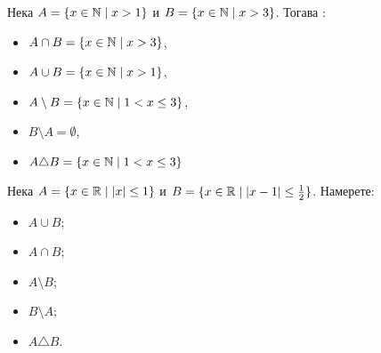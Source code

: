 \begin{example}
  Нека $A = \{x\in\mathbb{N}\mid x > 1\}$ и $B = \{x\in\mathbb{N}\mid x>3\}$. Тогава :
  \begin{itemize}
    \item
      $A\cap B = \{x\in\mathbb{N}\mid x > 3\}$,
    \item
      $A\cup B = \{x\in\mathbb{N}\mid x > 1\}$,
    \item
      $A\setminus B = \{x\in\mathbb{N}\mid 1<x\leq 3\}$,
    \item
      $B\setminus A = \emptyset$,
    \item
      $A\triangle B = \{x\in\mathbb{N}\mid 1<x\leq 3\}$
    \end{itemize}
\end{example}


\begin{problem}
  Нека $A = \{x\in\mathbb{R}\mid |x|\leq 1\}$ и $B = \{x\in\mathbb{R}\mid |x-1|\leq \frac{1}{2}\}$.
  Намерете:
  \begin{itemize}
  \item 
    $A\cup B$;
  \item
    $A\cap B$;
  \item
    $A\setminus B$;
  \item
    $B\setminus A$;
  \item
    $A \triangle B$.
  \end{itemize}
\end{problem}







